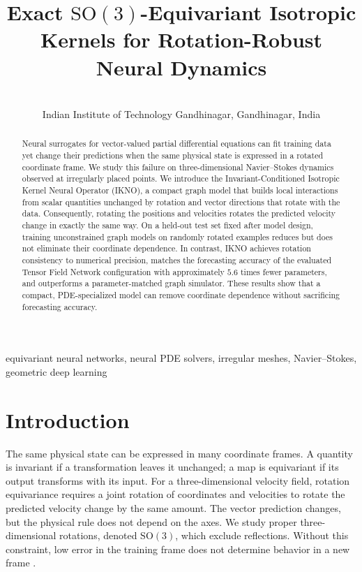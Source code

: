 \documentclass[mlmain]{jmlr}
\title[Isotropic Kernels for Neural Dynamics]{Exact $\mathrm{SO}(3)$-Equivariant Isotropic Kernels for Rotation-Robust Neural Dynamics}
\author{
  \Name{Ridham Patel} \Email{ridham.patel@iitgn.ac.in}\\
  \addr Indian Institute of Technology Gandhinagar, Gandhinagar, India
}
\newcommand{\IKNO}{\textsc{IKNO}}
\begin{document}
\maketitle

\begin{abstract}
Neural surrogates for vector-valued partial differential equations can fit
training data yet change their predictions when the same physical state is
expressed in a rotated coordinate frame. We study this failure on
three-dimensional Navier--Stokes dynamics observed at irregularly placed
points. We introduce the Invariant-Conditioned Isotropic Kernel Neural Operator
(\IKNO), a compact graph model that builds local interactions from scalar
quantities unchanged by rotation and vector directions that rotate with the
data. Consequently, rotating the positions and velocities rotates the
predicted velocity change in exactly the same way. On a held-out test set fixed
after model design, training unconstrained graph models on randomly rotated
examples reduces but does not eliminate their coordinate dependence. In
contrast, \IKNO{} achieves rotation consistency to numerical precision,
matches the forecasting accuracy of the evaluated Tensor Field Network
configuration with approximately $5.6$ times fewer parameters, and outperforms
a parameter-matched graph simulator. These results show that a
compact, PDE-specialized model can remove coordinate dependence without
sacrificing forecasting accuracy.
\end{abstract}

\begin{keywords}
equivariant neural networks, neural PDE solvers, irregular meshes,
Navier--Stokes, geometric deep learning
\end{keywords}

\section{Introduction}
\label{sec:introduction}

The same physical state can be expressed in many coordinate frames. A quantity
is invariant if a transformation leaves it unchanged; a map is
equivariant if its output transforms with its input. For a
three-dimensional velocity field, rotation equivariance requires a joint
rotation of coordinates and velocities to rotate the predicted velocity change
by the same amount. The vector prediction changes, but the physical rule does
not depend on the axes. We study proper three-dimensional rotations, denoted
$\mathrm{SO}(3)$, which exclude reflections. Without this constraint, low error
in the training frame does not determine behavior in a new frame
\citep{villar2021scalars,helwig2023gfno}.
\end{document}
